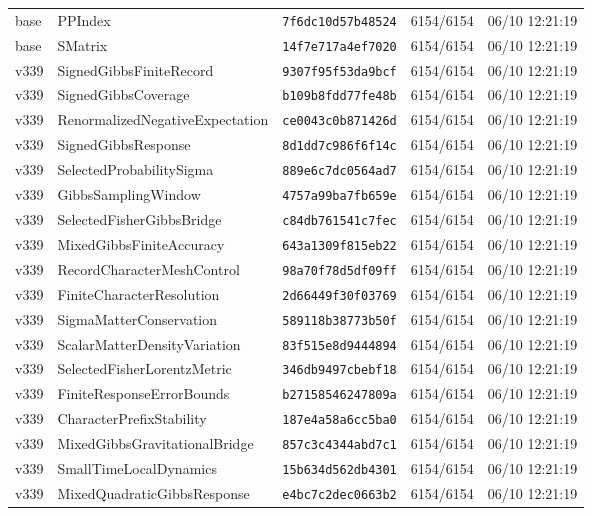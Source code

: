 \documentclass[11pt]{article}
\theoremstyle{definition}\newtheorem{deriv}{Derivation}
\begin{document}
{\begin{longtable}{@{}lllll@{}}
base & PPIndex & \texttt{7f6dc10d57b48524} & 6154/6154 & 06/10 12:21:19 \\
base & SMatrix & \texttt{14f7e717a4ef7020} & 6154/6154 & 06/10 12:21:19 \\
v339 & SignedGibbsFiniteRecord & \texttt{9307f95f53da9bcf} & 6154/6154 & 06/10 12:21:19 \\
v339 & SignedGibbsCoverage & \texttt{b109b8fdd77fe48b} & 6154/6154 & 06/10 12:21:19 \\
v339 & RenormalizedNegativeExpectation & \texttt{ce0043c0b871426d} & 6154/6154 & 06/10 12:21:19 \\
v339 & SignedGibbsResponse & \texttt{8d1dd7c986f6f14c} & 6154/6154 & 06/10 12:21:19 \\
v339 & SelectedProbabilitySigma & \texttt{889e6c7dc0564ad7} & 6154/6154 & 06/10 12:21:19 \\
v339 & GibbsSamplingWindow & \texttt{4757a99ba7fb659e} & 6154/6154 & 06/10 12:21:19 \\
v339 & SelectedFisherGibbsBridge & \texttt{c84db761541c7fec} & 6154/6154 & 06/10 12:21:19 \\
v339 & MixedGibbsFiniteAccuracy & \texttt{643a1309f815eb22} & 6154/6154 & 06/10 12:21:19 \\
v339 & RecordCharacterMeshControl & \texttt{98a70f78d5df09ff} & 6154/6154 & 06/10 12:21:19 \\
v339 & FiniteCharacterResolution & \texttt{2d66449f30f03769} & 6154/6154 & 06/10 12:21:19 \\
v339 & SigmaMatterConservation & \texttt{589118b38773b50f} & 6154/6154 & 06/10 12:21:19 \\
v339 & ScalarMatterDensityVariation & \texttt{83f515e8d9444894} & 6154/6154 & 06/10 12:21:19 \\
v339 & SelectedFisherLorentzMetric & \texttt{346db9497cbebf18} & 6154/6154 & 06/10 12:21:19 \\
v339 & FiniteResponseErrorBounds & \texttt{b27158546247809a} & 6154/6154 & 06/10 12:21:19 \\
v339 & CharacterPrefixStability & \texttt{187e4a58a6cc5ba0} & 6154/6154 & 06/10 12:21:19 \\
v339 & MixedGibbsGravitationalBridge & \texttt{857c3c4344abd7c1} & 6154/6154 & 06/10 12:21:19 \\
v339 & SmallTimeLocalDynamics & \texttt{15b634d562db4301} & 6154/6154 & 06/10 12:21:19 \\
v339 & MixedQuadraticGibbsResponse & \texttt{e4bc7c2dec0663b2} & 6154/6154 & 06/10 12:21:19 \\

\end{longtable}}
\end{document}
